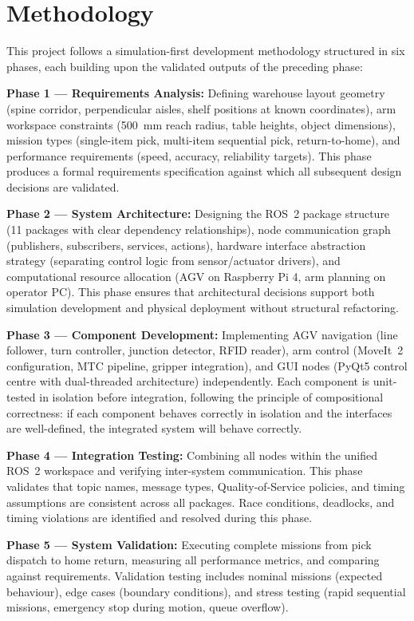 \documentclass[12pt,a4paper,oneside]{report}
\begin{document}
\section{Methodology}

This project follows a simulation-first development methodology structured in six phases, each building upon the validated outputs of the preceding phase:

\textbf{Phase 1 --- Requirements Analysis:} Defining warehouse layout geometry (spine corridor, perpendicular aisles, shelf positions at known coordinates), arm workspace constraints (500~mm reach radius, table heights, object dimensions), mission types (single-item pick, multi-item sequential pick, return-to-home), and performance requirements (speed, accuracy, reliability targets). This phase produces a formal requirements specification against which all subsequent design decisions are validated.

\textbf{Phase 2 --- System Architecture:} Designing the ROS~2 package structure (11 packages with clear dependency relationships), node communication graph (publishers, subscribers, services, actions), hardware interface abstraction strategy (separating control logic from sensor/actuator drivers), and computational resource allocation (AGV on Raspberry Pi 4, arm planning on operator PC). This phase ensures that architectural decisions support both simulation development and physical deployment without structural refactoring.

\textbf{Phase 3 --- Component Development:} Implementing AGV navigation (line follower, turn controller, junction detector, RFID reader), arm control (MoveIt~2 configuration, MTC pipeline, gripper integration), and GUI nodes (PyQt5 control centre with dual-threaded architecture) independently. Each component is unit-tested in isolation before integration, following the principle of compositional correctness: if each component behaves correctly in isolation and the interfaces are well-defined, the integrated system will behave correctly.

\textbf{Phase 4 --- Integration Testing:} Combining all nodes within the unified ROS~2 workspace and verifying inter-system communication. This phase validates that topic names, message types, Quality-of-Service policies, and timing assumptions are consistent across all packages. Race conditions, deadlocks, and timing violations are identified and resolved during this phase.

\textbf{Phase 5 --- System Validation:} Executing complete missions from pick dispatch to home return, measuring all performance metrics, and comparing against requirements. Validation testing includes nominal missions (expected behaviour), edge cases (boundary conditions), and stress testing (rapid sequential missions, emergency stop during motion, queue overflow).
\end{document}
